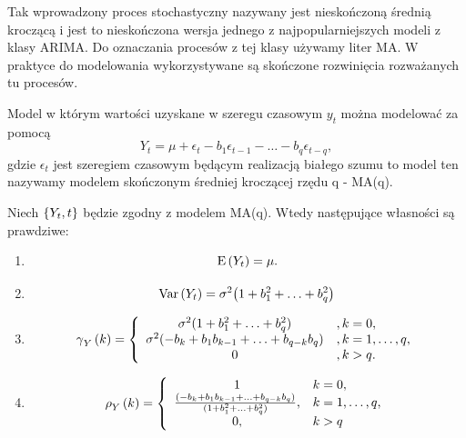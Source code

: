 \documentclass[10pt,a4paper]{book}
\newcommand{\tsAutoCovariance}[3][\gamma]{\operatorname{#1}_{#2} \left({#3}\right)}
\newcommand{\tsAutoCorellation}[3][\rho]{\operatorname{#1}_{#2} \left({#3}\right)}
\begin{document}
Tak wprowadzony proces stochastyczny nazywany jest nieskończoną średnią kroczącą i jest to nieskończona wersja jednego z najpopularniejszych modeli z klasy ARIMA. Do oznaczania procesów z tej klasy używamy liter MA. W praktyce do modelowania wykorzystywane są skończone rozwinięcia rozważanych tu procesów.

\begin{definition}
Model w którym wartości uzyskane w szeregu czasowym $y_t$ można modelować za pomocą
$$
Y_t = \mu + \epsilon_t - b_1 \epsilon_{t-1} -\ldots - b_q \epsilon_{t-q},
$$
gdzie $\epsilon_t $ jest szeregiem czasowym będącym realizacją białego szumu to model ten nazywamy modelem skończonym średniej kroczącej rzędu q - MA(q).
\end{definition}

\begin{theorem}
Niech $\left\lbrace {{Y_t}, {t}} \right\rbrace$ będzie zgodny z modelem MA(q).
Wtedy następujące własności są prawdziwe:
\begin{enumerate}
\item 
$$
\operatorname{E} \left({Y_t} \right) = \mu.
$$
\item 
$$
\operatorname{Var} \left( {Y_t} \right)  = \sigma^2 {\left( {1+ b_1^2 + \ldots + b_q^2} \right)}
$$
\item 
$$
\tsAutoCovariance{Y}{k} = \left\lbrace \begin{array}{c l}
\sigma^2 (1 + b_1^2 + \ldots + b_q^2) &, k=0,\\
\sigma^2 \bracket{- b_k + b_1 b_{k-1} + \ldots + b_{q-k} b_q} &, k=1,\ldots,q ,\\
0&, k > q.
\end{array} \right.
$$
\item 
$$
\tsAutoCorellation{Y}{k} = \left \lbrace 
\begin{array}{c l}
1& k=0,\\
\frac{\bracket{- b_k + b_1 b_{k-1} + \ldots + b_{q-k} b_q}}{(1 + b_1^2 + \ldots + b_q^2)},& k=1,\ldots,q ,\\
0, & k > q
\end{array}
 \right.
$$
\end{enumerate}
\end{theorem}
\end{document}
